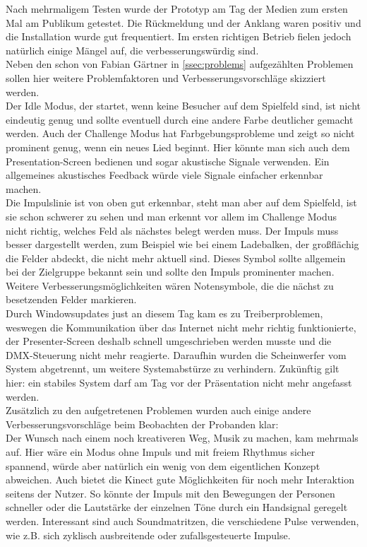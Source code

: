 \label{ssec:Praxis}

Nach mehrmaligem Testen wurde der Prototyp am Tag der Medien zum ersten Mal am Publikum getestet. Die Rückmeldung und der Anklang waren positiv und die Installation wurde gut frequentiert. Im ersten richtigen Betrieb fielen jedoch natürlich einige Mängel auf, die verbesserungswürdig sind.\\

Neben den schon von Fabian Gärtner in \autoref{ssec:problems} aufgezählten Problemen sollen hier weitere Problemfaktoren und Verbesserungsvorschläge skizziert werden.\\
Der Idle Modus, der startet, wenn keine Besucher auf dem Spielfeld sind, ist nicht eindeutig genug und sollte eventuell durch eine andere Farbe deutlicher gemacht werden. Auch der Challenge Modus hat Farbgebungsprobleme und zeigt so nicht prominent genug, wenn ein neues Lied beginnt. Hier könnte man sich auch dem Presentation-Screen bedienen und sogar akustische Signale verwenden. Ein allgemeines akustisches Feedback würde viele Signale einfacher erkennbar machen.\\
Die Impulslinie ist von oben gut erkennbar, steht man aber auf dem Spielfeld, ist sie schon schwerer zu sehen und man erkennt vor allem im Challenge Modus nicht richtig, welches Feld als nächstes belegt werden muss. Der Impuls muss besser dargestellt werden, zum Beispiel wie bei einem Ladebalken, der großflächig die Felder abdeckt, die nicht mehr aktuell sind. Dieses Symbol sollte allgemein bei der Zielgruppe bekannt sein und sollte den Impuls prominenter machen. Weitere Verbesserungsmöglichkeiten wären Notensymbole, die die nächst zu besetzenden Felder markieren.\\ 
Durch Windowsupdates just an diesem Tag kam es zu Treiberproblemen, weswegen die Kommunikation über das Internet nicht mehr richtig funktionierte, der Presenter-Screen deshalb schnell umgeschrieben werden musste und die DMX-Steuerung nicht mehr reagierte. Daraufhin wurden die Scheinwerfer vom System abgetrennt, um weitere Systemabstürze zu verhindern. Zukünftig gilt hier: ein stabiles System darf am Tag vor der Präsentation nicht mehr angefasst werden.\\
Zusätzlich zu den aufgetretenen Problemen wurden auch einige andere Verbesserungsvorschläge beim Beobachten der Probanden klar:\\
Der Wunsch nach einem noch kreativeren Weg, Musik zu machen, kam mehrmals auf. Hier wäre ein Modus ohne Impuls und mit freiem Rhythmus sicher spannend, würde aber natürlich ein wenig von dem eigentlichen Konzept abweichen. Auch bietet die Kinect gute Möglichkeiten für noch mehr Interaktion seitens der Nutzer. So könnte der Impuls mit den Bewegungen der Personen schneller oder die Lautstärke der einzelnen Töne durch ein Handsignal geregelt werden. Interessant sind auch Soundmatritzen, die verschiedene Pulse verwenden, wie z.B. sich zyklisch ausbreitende oder zufallsgesteuerte Impulse.\\
